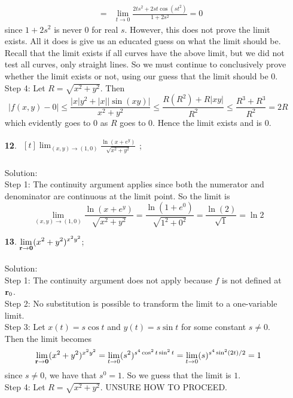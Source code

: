 \documentclass[12pt]{amsbook}
\begin{document}
\begin{enumerate}
\begin{eqnarray*}
&=&\lim_{t \rightarrow 0}\frac{2ts^2+2st\cos(st^2)}{1+2s^2}=0
\end{eqnarray*}
since $1+2s^2$ is never $0$ for real $s$. However, this does not prove the limit exists. All it does is give us an educated guess on what the limit should be. Recall that the limit exists if all curves have the above limit, but we did not test all curves, only straight lines. So we must continue to conclusively prove whether the limit exists or not, using our guess that the limit should be $0$.
\\
{\sf Step 4}: Let $R=\sqrt{x^2+y^2}$. Then
$$|f(x,y)-0|\leq \frac{|x|y^2+|x||\sin(xy)|}{x^2+y^2} \leq \frac{R(R^2)+R|xy|}{R^2} \leq \frac{R^3+R^3}{R^2}=2R$$
which evidently goes to $0$ as $R$ goes to $0$. Hence the limit exists and is $0$.
\\
\item[{\small\bf 12}.] $\! \begin{aligned}[t]
\lim_{(x,y) \rightarrow (1,0)}\frac{\ln(x+e^y)}{\sqrt{x^2+y^2}} \end{aligned}$;
\\
\\
{\sc Solution}:
\\
{\sf Step 1}: The continuity argument applies since both the numerator and denominator are continuous at the limit point. So the limit is
$$\lim_{(x,y) \rightarrow (1,0)}\frac{\ln(x+e^y)}{\sqrt{x^2+y^2}}=\frac{\ln(1+e^0)}{\sqrt{1^2+0^2}}=\frac{\ln(2)}{\sqrt{1}}=\ln 2$$
\item[{\small\bf 13}.] $\! \begin{aligned}[t]
\lim_{{\bf r} \rightarrow {\bf 0}}(x^2+y^2)^{x^2y^2} \end{aligned}$;
\\
\\
{\sc Solution}:
\\
{\sf Step 1}: The continuity argument does not apply because $f$ is not defined at ${\bf r}_0$.
\\
{\sf Step 2}: No substitution is possible to transform the limit to a one-variable
limit.
\\
{\sf Step 3}: Let $x(t)=s\cos t$ and $y(t)=s \sin t$ for some constant $s \neq 0$. Then the limit becomes
$$\lim_{{\bf r} \rightarrow {\bf 0}}(x^2+y^2)^{x^2y^2}=\lim_{t \rightarrow 0}(s^2)^{s^4\cos^2t\sin^2t}=\lim_{t \rightarrow 0}(s)^{s^4\sin^2(2t)/2}=1$$
since $s\neq 0$, we have that $s^0=1$. So we guess that the limit is $1$.
\\
{\sf Step 4}: Let $R=\sqrt{x^2+y^2}$. UNSURE HOW TO PROCEED.
\begin{eqnarray*}

\end{eqnarray*}
\end{enumerate}
\end{document}
